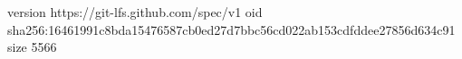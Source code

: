 version https://git-lfs.github.com/spec/v1
oid sha256:16461991c8bda15476587cb0ed27d7bbc56cd022ab153cdfddee27856d634c91
size 5566
